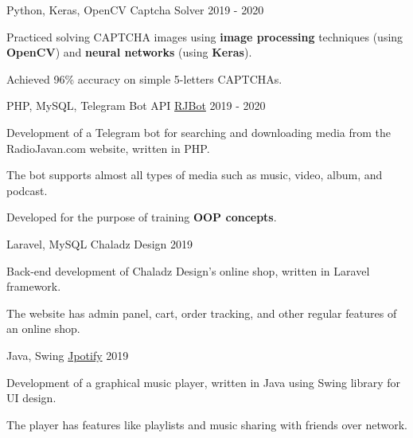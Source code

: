 \begin{cventries}
  \cventry
    {Python, Keras, OpenCV} %
    {Captcha Solver} %
    {} %
    {2019 - 2020} %
    {
      \begin{cvitems} %
      	\item {Practiced solving CAPTCHA images using \textbf{image processing} techniques (using \textbf{OpenCV}) and \textbf{neural networks} (using \textbf{Keras}).}
      	\item {Achieved 96\% accuracy on simple 5-letters CAPTCHAs.}
      \end{cvitems}
    }

  \cventry
    {PHP, MySQL, Telegram Bot API} %
    {\href{https://github.com/radinshayanfar/RJBot}{RJBot}} %
    {} %
    {2019 - 2020} %
    {
      \begin{cvitems} %
        \item {Development of a Telegram bot for searching and downloading media from the RadioJavan.com website, written in PHP.}
		    \item {The bot supports almost all types of media such as music, video, album, and podcast.}
		    \item {Developed for the purpose of training \textbf{OOP concepts}.}
      \end{cvitems}
    }

  \cventry
    {Laravel, MySQL} %
    {Chaladz Design} %
    {} %
    {2019} %
    {
      \begin{cvitems} %
        \item {Back-end development of Chaladz Design's online shop, written in Laravel framework.} %
		\item {The website has admin panel, cart, order tracking, and other regular features of an online shop.}
      \end{cvitems}
    }

  \cventry
    {Java, Swing} %
    {\href{https://github.com/radinshayanfar/Jpotify}{Jpotify}} %
    {} %
    {2019} %
    {
      \begin{cvitems} %
        \item {Development of a graphical music player, written in Java using Swing library for UI design.}
		\item {The player has features like playlists and music sharing with friends over network.}
      \end{cvitems}
    }


\end{cventries}
